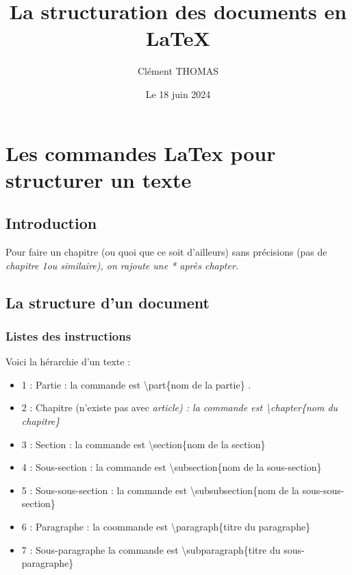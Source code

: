 \documentclass[a4paper,  10pt]{book}
\begin{document}
\frontmatter %

\title{La structuration des documents en LaTeX}
\author{Clément THOMAS}
\date{Le 18 juin 2024}

\mainmatter %

\part{Les commandes LaTex pour structurer un texte}
\chapter*{Introduction}
Pour faire un chapitre (ou quoi que ce soit d'ailleurs) sans précisions (pas de \em chapitre 1\em   ou similaire), on rajoute une * après chapter.

\chapter{La structure d'un document}
\section{Listes des instructions}
Voici la hérarchie d'un texte : 
\begin{itemize}

\item 1 : Partie : la commande est \textbackslash part\{nom de la partie\} .
\item 2 : Chapitre (n'existe pas avec \em article\em) : la commande est \textbackslash chapter\{nom du chapitre\}
\item 3 : Section : la commande est \textbackslash section\{nom de la section\}
\item 4 : Sous-section : la commande est \textbackslash subsection\{nom de la sous-section\}
\item 5 : Sous-sous-section : la commande est \textbackslash subsubsection\{nom de la sous-sous-section\}
\item 6 : Paragraphe : la coommande est \textbackslash paragraph\{titre du paragraphe\}
\item 7 : Sous-paragraphe la commande est \textbackslash subparagraph\{titre du sous-paragraphe\}

\end{itemize}
\end{document}
